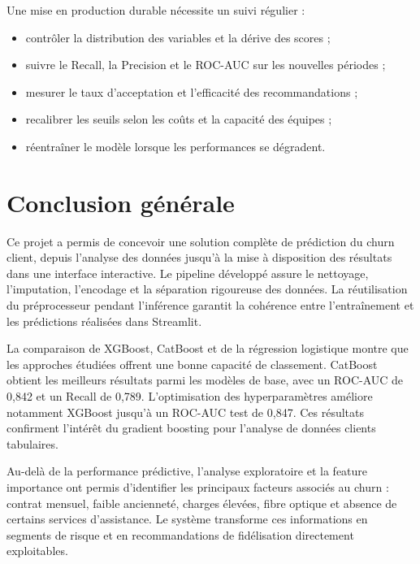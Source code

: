 \documentclass[12pt, a4paper]{article}
\begin{document}
Une mise en production durable nécessite un suivi régulier :
\begin{itemize}[leftmargin=*]
    \item contrôler la distribution des variables et la dérive des scores ;
    \item suivre le Recall, la Precision et le ROC-AUC sur les nouvelles
    périodes ;
    \item mesurer le taux d'acceptation et l'efficacité des recommandations ;
    \item recalibrer les seuils selon les coûts et la capacité des équipes ;
    \item réentraîner le modèle lorsque les performances se dégradent.
\end{itemize}

\clearpage
\section*{Conclusion générale}

Ce projet a permis de concevoir une solution complète de prédiction du churn
client, depuis l'analyse des données jusqu'à la mise à disposition des
résultats dans une interface interactive. Le pipeline développé assure le
nettoyage, l'imputation, l'encodage et la séparation rigoureuse des données. La
réutilisation du préprocesseur pendant l'inférence garantit la cohérence entre
l'entraînement et les prédictions réalisées dans Streamlit.

La comparaison de XGBoost, CatBoost et de la régression logistique montre que
les approches étudiées offrent une bonne capacité de classement. CatBoost
obtient les meilleurs résultats parmi les modèles de base, avec un ROC-AUC de
0,842 et un Recall de 0,789. L'optimisation des hyperparamètres améliore
notamment XGBoost jusqu'à un ROC-AUC test de 0,847. Ces résultats confirment
l'intérêt du gradient boosting pour l'analyse de données clients tabulaires.

Au-delà de la performance prédictive, l'analyse exploratoire et la feature
importance ont permis d'identifier les principaux facteurs associés au churn :
contrat mensuel, faible ancienneté, charges élevées, fibre optique et absence
de certains services d'assistance. Le système transforme ces informations en
segments de risque et en recommandations de fidélisation directement
exploitables.
\end{document}
